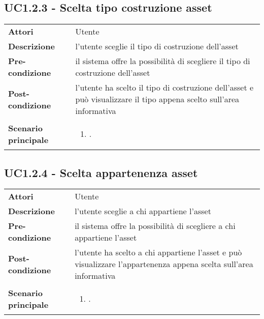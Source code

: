 \subsection{UC1.2.3 - Scelta tipo costruzione asset} 
\label{sssec:UC1.2.3} 
\def\arraystretch{1.5}
\begin{tabularx}{\textwidth}{l|p{}}
	\rowcolor{I} \multicolumn{2}{c}{\color{white}\textbf{UC1.2.3 - Scelta tipo costruzione asset}} \\
	\toprule
	\endhead
	\textbf{Attori} & Utente\\
	\textbf{Descrizione} & l'utente sceglie il tipo di costruzione dell'asset\\
	\textbf{Pre-condizione} & il sistema offre la possibilità di scegliere il tipo di costruzione dell'asset\\
	\textbf{Post-condizione} & l'utente ha scelto il tipo di costruzione dell'asset e può visualizzare il tipo appena scelto sull'area informativa\\
	\textbf{Scenario principale} & \vspace{-1.2em}\begin{enumerate}[leftmargin=*,noitemsep,nosep]
		\item \nameref{sssec:UC1.2.3}.
	\end{enumerate}\\
	\bottomrule
\end{tabularx}
\subsection{UC1.2.4 - Scelta appartenenza asset} 
\label{sssec:UC1.2.4} 
\def\arraystretch{1.5}
\begin{tabularx}{\textwidth}{l|p{}}
	\rowcolor{I} \multicolumn{2}{c}{\color{white}\textbf{UC1.2.4 - Scelta appartenenza asset}} \\
	\toprule
	\endhead
	\textbf{Attori} & Utente\\
	\textbf{Descrizione} & l'utente sceglie a chi appartiene l'asset\\
	\textbf{Pre-condizione} & il sistema offre la possibilità di scegliere a chi appartiene l'asset\\
	\textbf{Post-condizione} & l'utente ha scelto a chi appartiene l'asset e può visualizzare l'appartenenza appena scelta sull'area informativa\\
	\textbf{Scenario principale} & \vspace{-1.2em}\begin{enumerate}[leftmargin=*,noitemsep,nosep]
		\item \nameref{sssec:UC1.2.4}.
	\end{enumerate}\\
	\bottomrule
\end{tabularx}
